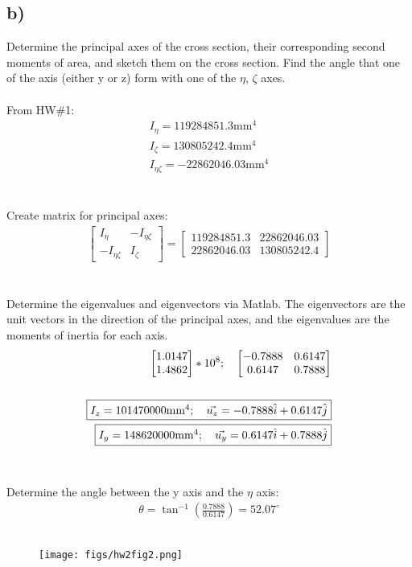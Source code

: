\documentclass[12 pt]{article}
\begin{document}
\subsection*{b)}
Determine the principal axes of the cross section, their corresponding second moments of
area, and sketch them on the cross section. Find the angle that one of the axis (either y or
z) form with one of the $\eta$, $\zeta$ axes. \\ \\
From HW\#1:
\begin{align*}
    I_{\eta} = 119284851.3\textrm{mm}^4 \\
    I_{\zeta}=130805242.4\textrm{mm}^4\\
    I_{\eta \zeta}=-22862046.03\textrm{mm}^4
\end{align*} \\ \\
Create matrix for principal axes:
\begin{align*}
    \begin{bmatrix}
        I_{\eta} & -I_{\eta \zeta} \\
        -I_{\eta \zeta} & I_{\zeta}
    \end{bmatrix} = \begin{bmatrix}
        119284851.3 & 22862046.03 \\
        22862046.03 & 130805242.4
    \end{bmatrix}
\end{align*} \\ \\
Determine the eigenvalues and eigenvectors via Matlab. The eigenvectors are the unit vectors in the direction of the
principal axes, and the eigenvalues are the moments of inertia for each axis.
\begin{align*}
    \begin{bmatrix}
        1.0147 \\
        1.4862
    \end{bmatrix}*10^8; \quad \begin{bmatrix}
        -0.7888 & 0.6147 \\
        0.6147 & 0.7888
    \end{bmatrix} \\ \\
    \fbox{$I_z = 101470000\textrm{mm}^4; \quad \vec{u_z}=-0.7888\hat{i}+0.6147\hat{j}$} \\
    \fbox{$I_y = 148620000\textrm{mm}^4; \quad \vec{u_y}=0.6147\hat{i}+0.7888\hat{j}$}
\end{align*} \\ \\
Determine the angle between the y axis and the $\eta$ axis:
\begin{align*}
    \theta = \tan^{-1}\left(\frac{0.7888}{0.6147}\right)=52.07^{\circ}
\end{align*} \\
\begin{figure}[H]
    \centering
    \texttt{[image: figs/hw2fig2.png]}
\end{figure} \par
\end{document}

